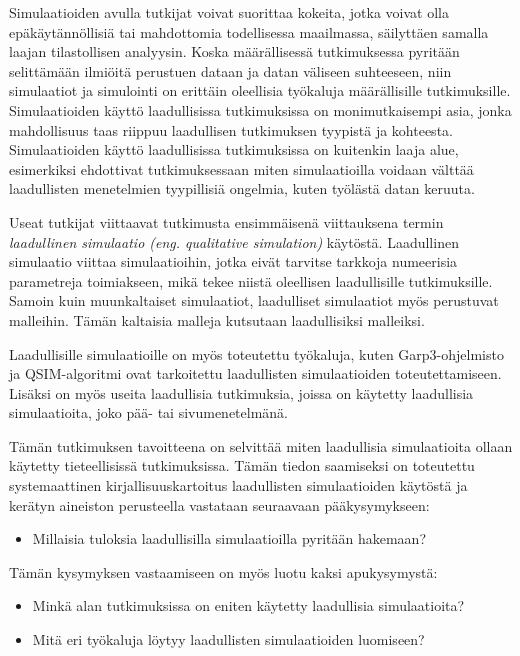 \documentclass[utf8]{gradu3}
\begin{document}
Simulaatioiden avulla tutkijat voivat suorittaa kokeita, jotka voivat olla epäkäytännöllisiä tai mahdottomia todellisessa maailmassa, säilyttäen samalla laajan tilastollisen analyysin. Koska määrällisessä tutkimuksessa pyritään selittämään ilmiöitä perustuen dataan ja datan väliseen suhteeseen, niin simulaatiot ja simulointi on erittäin oleellisia työkaluja määrällisille tutkimuksille. 
Simulaatioiden käyttö laadullisissa tutkimuksissa on monimutkaisempi asia, 
jonka mahdollisuus taas riippuu laadullisen tutkimuksen tyypistä ja kohteesta. 
Simulaatioiden käyttö laadullisissa tutkimuksissa on kuitenkin laaja alue, 
esimerkiksi \textcite{eldabi2002quantitative} ehdottivat tutkimuksessaan miten simulaatioilla voidaan välttää laadullisten menetelmien tyypillisiä ongelmia, kuten työlästä datan keruuta. 

Useat tutkijat viittaavat \textcite{kuipers1986qualitative} tutkimusta ensimmäisenä
viittauksena termin \textit{laadullinen simulaatio (eng. qualitative simulation)} 
käytöstä. Laadullinen simulaatio viittaa simulaatioihin, 
jotka eivät tarvitse tarkkoja numeerisia parametreja toimiakseen, 
mikä tekee niistä oleellisen laadullisille tutkimuksille. 
Samoin kuin muunkaltaiset simulaatiot, laadulliset simulaatiot myös perustuvat malleihin.
Tämän kaltaisia malleja kutsutaan laadullisiksi malleiksi.

Laadullisille simulaatioille on myös toteutettu työkaluja, kuten Garp3-ohjelmisto \parencite{bredeweg2007garp3} ja QSIM-algoritmi \parencite{helgstrand2004qsim} ovat tarkoitettu laadullisten simulaatioiden toteutettamiseen. Lisäksi on myös useita laadullisia tutkimuksia, joissa on käytetty laadullisia simulaatioita, joko pää- tai sivumenetelmänä.

Tämän tutkimuksen tavoitteena on selvittää miten laadullisia simulaatioita 
ollaan käytetty tieteellisissä tutkimuksissa. Tämän tiedon saamiseksi on
toteutettu systemaattinen kirjallisuuskartoitus 
laadullisten simulaatioiden käytöstä ja kerätyn aineiston perusteella vastataan 
seuraavaan pääkysymykseen:
\begin{itemize}
    \item Millaisia tuloksia laadullisilla simulaatioilla pyritään hakemaan?
\end{itemize}
\begin{comment}
Mietin kysyten järjestystä suhteessa toisiinsa. tavallaan nuo apukysymykset eivät kovinkaan selvästi tue itse pääkysymystä. apukysymykset vastaavat tavallaan kysymyksiin kuka (minkä alojen tutkijat), miten (millä työkaluilla) ja pääkysymys on enemmän miksi (tai osin mitä).
\end{comment}
Tämän kysymyksen vastaamiseen on myös luotu kaksi apukysymystä:
\begin{itemize}
    \item Minkä alan tutkimuksissa on eniten käytetty laadullisia simulaatioita?
    \item Mitä eri työkaluja löytyy laadullisten simulaatioiden luomiseen?
\end{itemize}
\end{document}
